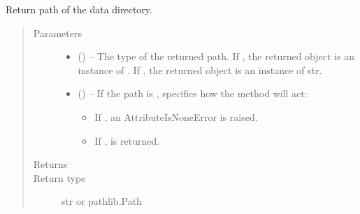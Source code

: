 \documentclass[letterpaper,10pt,english]{sphinxmanual}
\begin{document}
\begin{fulllineitems}
\begin{fulllineitems}
\label{\detokenize{references/core:nmrespy.core.Estimator.get_datapath}}
\sphinxAtStartPar
Return path of the data directory.
\begin{quote}\begin{description}
\item[{Parameters}] \leavevmode\begin{itemize}
\item {} 
\sphinxAtStartPar
{} (\sphinxstyleliteralemphasis{\sphinxupquote{, }}) – The type of the returned path. If , the returned object
is an instance of . If , the returned
object is an instance of str.

\item {} 
\sphinxAtStartPar
{} (\sphinxstyleliteralemphasis{\sphinxupquote{, }}) – 
\sphinxAtStartPar
If the path is ,  specifies how the method will act:
\begin{itemize}
\item {} 
\sphinxAtStartPar
If , an AttributeIsNoneError is raised.

\item {} 
\sphinxAtStartPar
If ,  is returned.

\end{itemize}


\end{itemize}

\item[{Returns}] \leavevmode
\sphinxAtStartPar
{}

\item[{Return type}] \leavevmode
\sphinxAtStartPar
str or pathlib.Path


\end{description}
\end{quote}
\end{fulllineitems}
\end{fulllineitems}
\end{document}
